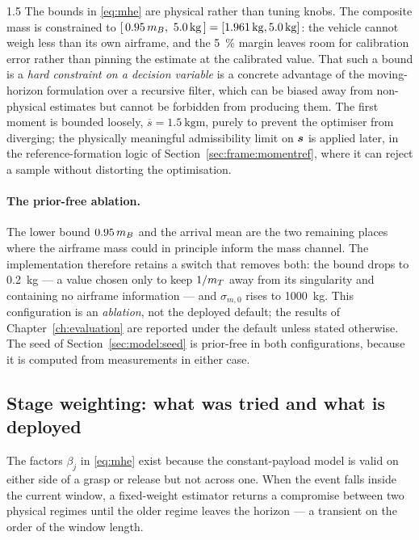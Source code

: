 \begin{spacing}{1.5}
The bounds in \eqref{eq:mhe} are physical rather than tuning knobs. The
composite mass is constrained to
$[\,0.95\,\mB,\ \SI{5.0}{\kg}\,]=[\SI{1.961}{\kg},\SI{5.0}{\kg}]$: the vehicle
cannot weigh less than its own airframe, and the \SI{5}{\percent} margin leaves
room for calibration error rather than pinning the estimate at the calibrated
value. That such a bound is a \emph{hard constraint on a decision variable} is a
concrete advantage of the moving-horizon formulation over a recursive filter,
which can be biased away from non-physical estimates but cannot be forbidden from
producing them. The first moment is bounded loosely,
$\overline{s}=\SI{1.5}{\kg\meter}$, purely to prevent the optimiser from
diverging; the physically meaningful admissibility limit on $\bm{s}$ is applied
later, in the reference-formation logic of Section~\ref{sec:frame:momentref},
where it can reject a sample without distorting the optimisation.

\paragraph{The prior-free ablation.} The lower bound $0.95\,m_B$ and the arrival
mean are the two remaining places where the airframe mass could in principle
inform the mass channel. The implementation therefore retains a switch that
removes both: the bound drops to \SI{0.2}{\kg} --- a value chosen only to keep
$1/m_T$ away from its singularity and containing no airframe information --- and
$\sigma_{m,0}$ rises to \SI{1000}{\kg}. This configuration is an
\emph{ablation}, not the deployed default; the results of
Chapter~\ref{ch:evaluation} are reported under the default unless stated
otherwise. The seed of Section~\ref{sec:model:seed} is prior-free in both
configurations, because it is computed from measurements in either case.

\subsection{Stage weighting: what was tried and what is deployed}\label{sec:frame:beta}

The factors $\beta_j$ in \eqref{eq:mhe} exist because the constant-payload model
is valid on either side of a grasp or release but not across one. When the event
falls inside the current window, a fixed-weight estimator returns a compromise
between two physical regimes until the older regime leaves the horizon --- a
transient on the order of the window length.


\end{spacing}
